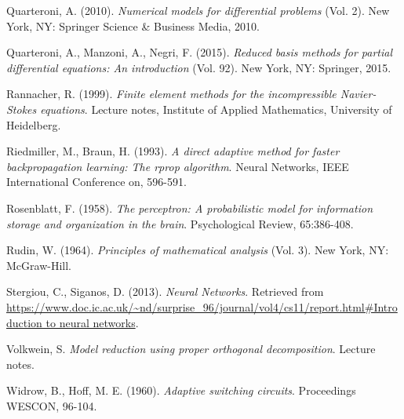 \documentclass[12pt, a4paper, twoside, openright]{report}
\numberwithin{equation}{chapter}
\theoremstyle{theorem}
\theoremstyle{definition}
\theoremstyle{remark}
\theoremstyle{proposition}
\numberwithin{figure}{chapter}
\begin{document}
\begin{thebibliography}{50}
		Quarteroni, A. (2010). \emph{Numerical models for differential problems} (Vol. 2). New York, NY: Springer Science \& Business Media, 2010.
		
		Quarteroni, A., Manzoni, A., Negri, F. (2015). \emph{Reduced basis methods for partial differential equations: An introduction} (Vol. 92). New York, NY: Springer, 2015.
		
		Rannacher, R. (1999). \emph{Finite element methods for the incompressible Navier-Stokes equations}. Lecture notes, Institute of Applied Mathematics, University of Heidelberg.
		
		Riedmiller, M., Braun, H. (1993). \emph{A direct adaptive method for faster backpropagation learning: The rprop algorithm}. Neural Networks, IEEE International Conference on, 596-591.
		
		Rosenblatt, F. (1958). \emph{The perceptron: A probabilistic model for information storage and organization in the brain}. Psychological Review, 65:386-408.
		
		Rudin, W. (1964). \emph{Principles of mathematical analysis} (Vol. 3). New York, NY: McGraw-Hill.
		
		Stergiou, C., Siganos, D. (2013). \emph{Neural Networks}. Retrieved from \url{https://www.doc.ic.ac.uk/~nd/surprise_96/journal/vol4/cs11/report.html#Introduction to neural networks}.
		
		Volkwein, S. \emph{Model reduction using proper orthogonal decomposition}. Lecture notes.
		
		Widrow, B., Hoff, M. E. (1960). \emph{Adaptive switching circuits}. Proceedings WESCON, 96-104.
		
	\end{thebibliography}	
	
\end{document}
